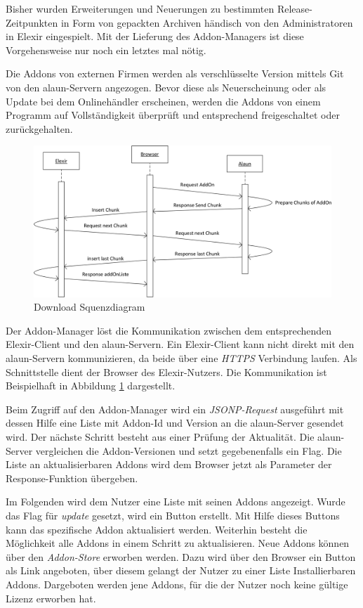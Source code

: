\documentclass[12pt]{article}
\begin{document}
Bisher wurden Erweiterungen und Neuerungen zu bestimmten Release-Zeitpunkten in Form von gepackten Archiven händisch von den Administratoren in Elexir eingespielt. 
Mit der Lieferung des Addon-Managers ist diese Vorgehensweise nur noch ein letztes mal nötig.

Die Addons von externen Firmen werden als verschlüsselte Version mittels Git von den alaun-Servern angezogen. Bevor diese als Neuerscheinung oder als Update bei dem Onlinehändler erscheinen, werden die Addons von einem Programm auf Vollständigkeit überprüft und entsprechend freigeschaltet oder zurückgehalten. 

\begin{figure}[h]
	\centering
	\includegraphics[width=1.0\textwidth]{Manager.png}
	\caption{Download Squenzdiagram}
	\label{fig:Manager}
\end{figure}


Der Addon-Manager löst die Kommunikation zwischen dem entsprechenden Elexir-Client und den alaun-Servern. Ein Elexir-Client kann nicht direkt mit den alaun-Servern kommunizieren, da beide über eine \textit{HTTPS} Verbindung laufen. Als Schnittstelle dient der Browser des Elexir-Nutzers.
Die Kommunikation ist Beispielhaft in Abbildung \ref{fig:Manager} dargestellt. 

Beim Zugriff auf den Addon-Manager wird ein \textit{JSONP-Request} ausgeführt mit dessen Hilfe eine Liste mit Addon-Id und Version an die alaun-Server gesendet wird. 
Der nächste Schritt besteht aus einer Prüfung der Aktualität. Die alaun-Server vergleichen die Addon-Versionen und setzt gegebenenfalls ein Flag. 
Die Liste an aktualisierbaren Addons wird dem Browser jetzt als Parameter der Response-Funktion übergeben.

Im Folgenden wird dem Nutzer eine Liste mit seinen Addons angezeigt. Wurde das Flag für \textit{update} gesetzt, wird ein Button erstellt.
Mit Hilfe dieses Buttons kann das spezifische Addon aktualisiert werden. Weiterhin besteht die Möglichkeit alle Addons in einem Schritt zu aktualisieren.
Neue Addons können über den \textit{Addon-Store} erworben werden. Dazu wird über den Browser ein Button als Link angeboten, über diesem gelangt der Nutzer zu einer Liste Installierbaren Addons.
Dargeboten werden jene Addons, für die der Nutzer noch keine gültige Lizenz erworben hat.
\end{document}
